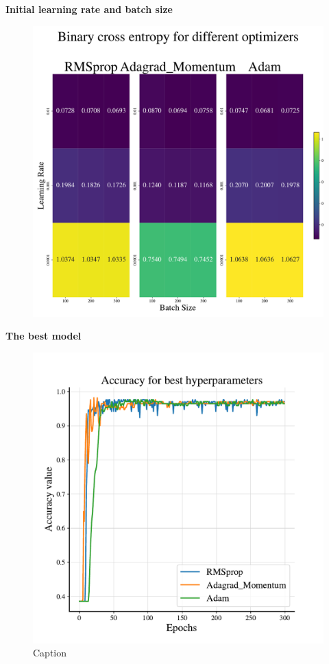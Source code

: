 \textbf{Initial learning rate and batch size}

\begin{figure}
    \centering
    \includegraphics[width=1.0\linewidth]{project_2/figures/Binary cross entropy_grid_classification.pdf}
    \caption{}    \label{fig:grid_cancer}
\end{figure}

\textbf{The best model}

\begin{figure}
    \centering
    \includegraphics[width=1.0\linewidth]{project_2/figures/best_classification.pdf}
    \caption{Caption}
    \label{fig:best_cancer}
\end{figure}

